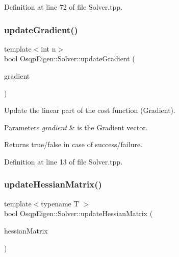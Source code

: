 Definition at line 72 of file Solver.\+tpp.

\mbox{\label{classOsqpEigen_1_1Solver_a7d1d9fdd8db3201a0ca2dcafbc289eea}} 
\subsubsection{\texorpdfstring{update\+Gradient()}{updateGradient()}}
{\footnotesize\ttfamily template$<$int n$>$ \\
bool Osqp\+Eigen\+::\+Solver\+::update\+Gradient (\begin{DoxyParamCaption}\item[{Eigen\+::\+Matrix$<$ c\+\_\+float, n, 1 $>$ \&}]{gradient }\end{DoxyParamCaption})}



Update the linear part of the cost function (Gradient). 


\begin{DoxyParams}{Parameters}
{\em gradient} & is the Gradient vector. \\
\hline
\end{DoxyParams}
\begin{DoxyReturn}{Returns}
true/false in case of success/failure. 
\end{DoxyReturn}


Definition at line 13 of file Solver.\+tpp.

\mbox{\label{classOsqpEigen_1_1Solver_a3380601ced1a2db8b226f7a32e5dd6b3}} 
\subsubsection{\texorpdfstring{update\+Hessian\+Matrix()}{updateHessianMatrix()}}
{\footnotesize\ttfamily template$<$typename T $>$ \\
bool Osqp\+Eigen\+::\+Solver\+::update\+Hessian\+Matrix (\begin{DoxyParamCaption}\item[{const Eigen\+::\+Sparse\+Matrix$<$ T $>$ \&}]{hessian\+Matrix }\end{DoxyParamCaption})}



